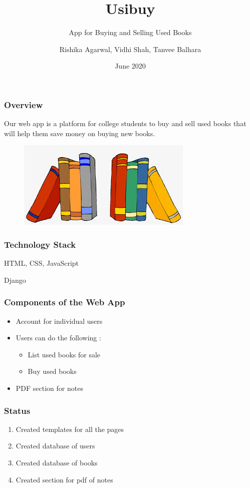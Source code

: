 \documentclass[14pt]{beamer}
\title[USED BOOKS]{Usibuy}
\subtitle{App for Buying and Selling Used Books}
\author[Team 14]{Rishika Agarwal, Vidhi Shah, Tanvee Balhara}
\date{June 2020}
\begin{document}
\begin{frame}
    \titlepage
\end{frame}

\begin{frame}
    \frametitle{Overview}
    Our web app is a platform for college students to buy and sell used books that will help them save money on buying new books.
    \begin{figure}
        \includegraphics[scale=0.5]{books.jpg}
    \end{figure}
\end{frame}

\begin{frame}
    \frametitle{Technology Stack}
    \begin{description}
        \item<1-> [Front-end] HTML, CSS, JavaScript
        \item<2-> [Back-end] Django
    \end{description}
\end{frame}

\begin{frame}
    \frametitle{Components of the Web App}
    \begin{itemize}
        \item<1->  Account for individual users
        \item<2->  Users can do the following :
            \begin{itemize}
                \item<3->  List used books for sale
                \item<4->  Buy used books
            \end{itemize}
        \item<5->  PDF section for notes
    \end{itemize}
\end{frame}

\begin{frame}
    \frametitle{Status}
        \begin{enumerate}
            \item<1-> Created templates for all the pages
            \item<2-> Created database of users
            \item<3-> Created database of books
            \item<4-> Created section for pdf of notes
        \end{enumerate}
\end{frame}
\end{document}
